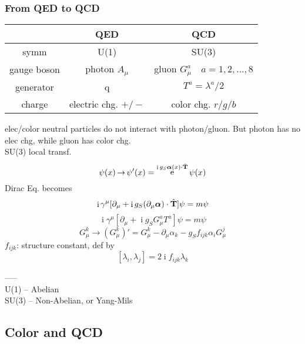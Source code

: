 \documentclass[a4paper]{article}
\DeclareMathOperator{\e}{\mathrm{e}}
\DeclareMathOperator{\I}{\mathrm{i}}
\DeclareMathOperator{\ra}{\rightarrow}
\DeclareMathOperator{\hT}{\hat{\vb{T}}}
\numberwithin{equation}{section}
\begin{document}
\subsubsection{From QED to QCD}
\begin{table}[H]
	\centering
	\begin{tabular}{|c|c|c|}
		\hline
		               & QED      &  QCD \\ \hline
		symm           & U(1)     &  SU(3) \\ \hline
		gauge boson & photon $ A_\mu $   & gluon $ G_\mu^a \quad a = 1,2,...,8$
		\\ \hline
		generator   & q           & $ T^a = \lambda^a / 2 $
		\\ \hline
		charge      & electric chg. $ +/- $ & color chg. $ r/g/b $ \\ \hline
	\end{tabular}
\end{table}
elec/color neutral particles do not interact with photon/gluon. But photon has no elec chg, while gluon has color chg.\\
SU(3) local transf.
\begin{equation}\label{key}
\psi(x) \ra \psi'(x) = \e^{\I g_S \bm\alpha(x)\cdot\hT} \psi(x)
\end{equation}
Dirac Eq. becomes
\begin{equation}\label{key}
\I\gamma^\mu [\partial_\mu + \I g_S(\partial_\mu \bm\alpha)\cdot\hT] \psi = m\psi
\end{equation}
\begin{equation}\label{key}
\I\gamma^\mu [\partial_\mu + \I g_S G_\mu^a T^a] \psi = m\psi
\end{equation}
\begin{equation}\label{key}
G_\mu^k \ra (G_\mu^k)' = G_\mu^k - \partial_\mu \alpha_k - g_S f_{ijk} \alpha_i G_\mu^j 
\end{equation}
$ f_{ijk} $: structure constant, def by
\begin{equation}\label{key}
[\lambda_i, \lambda_j] = 2\I f_{ijk}\lambda_k
\end{equation}

-----\\
U(1) -- Abelian\\
SU(3) -- Non-Abelian, or Yang-Mils

\subsection{Color and QCD}
\end{document}
